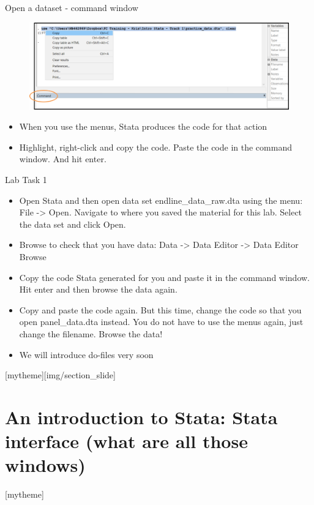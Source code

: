 \documentclass[aspectratio=169]{beamer}
\newcommand{\sectionpic}[2]{
	\setbeamertemplate{section page}[mytheme][#2]
	\section{#1}
	\setbeamertemplate{section page}[mytheme]
}
\begin{document}
\begin{frame}[fragile]{Open a dataset - command window}
	\begin{figure}
		\centering
		\includegraphics[width=\linewidth]{img/open_data_command}
	\end{figure}
\begin{itemize}
	\item When you use the menus, Stata produces the code for that action
	\item Highlight, right-click and copy the code. Paste the code in the command window. And hit enter.
\end{itemize}
\end{frame}

\begin{frame}{Lab Task 1}
\begin{itemize}
	\item Open Stata and then open data set endline\_data\_raw.dta using the menu: File -> Open. \newline Navigate to where you saved the material for this lab. Select the data set and click Open.
	\item Browse to check that you have data: Data -> Data Editor -> Data Editor Browse 
	\item Copy the code Stata generated for you and paste it in the command window. Hit enter and then browse the data again.
	\item Copy and paste the code again. But this time, change the code so that you open panel\_data.dta instead. You do not have to use the menus again, just change the filename. Browse the data!
	\item We will introduce do-files very soon
\end{itemize}
\end{frame}


\sectionpic{An introduction to Stata: Stata interface (what are all those windows)}{img/section_slide}
\end{document}
